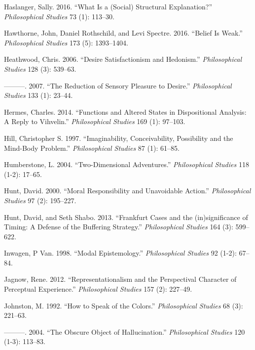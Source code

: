 \documentclass[
  10pt,
  letterpaper,
  DIV=11,
  numbers=noendperiod,
  twoside]{scrartcl}
\newlength{\cslhangindent}
\newenvironment{CSLReferences}[2] %
 {\begin{list}{}{%
  \setlength{\itemindent}{0pt}
  \setlength{\leftmargin}{0pt}
  \setlength{\parsep}{0pt}
  \ifodd #1
   \setlength{\leftmargin}{\cslhangindent}
   \setlength{\itemindent}{-1\cslhangindent}
  \fi
  \setlength{\itemsep}{#2\baselineskip}}}
 {\end{list}}
\begin{document}
\begin{CSLReferences}{1}{0}
Haslanger, Sally. 2016. {``What Is a (Social) Structural Explanation?''}
\emph{Philosophical Studies} 73 (1): 113--30.

Hawthorne, John, Daniel Rothschild, and Levi Spectre. 2016. {``Belief Is
Weak.''} \emph{Philosophical Studies} 173 (5): 1393--1404.

Heathwood, Chris. 2006. {``Desire Satisfactionism and Hedonism.''}
\emph{Philosophical Studies} 128 (3): 539--63.

---------. 2007. {``The Reduction of Sensory Pleasure to Desire.''}
\emph{Philosophical Studies} 133 (1): 23--44.

Hermes, Charles. 2014. {``Functions and Altered States in Dispositional
Analysis: A Reply to Vihvelin.''} \emph{Philosophical Studies} 169 (1):
97--103.

Hill, Christopher S. 1997. {``Imaginability, Conceivability, Possibility
and the Mind-Body Problem.''} \emph{Philosophical Studies} 87 (1):
61--85.

Humberstone, L. 2004. {``Two-Dimensional Adventures.''}
\emph{Philosophical Studies} 118 (1-2): 17--65.

Hunt, David. 2000. {``Moral Responsibility and Unavoidable Action.''}
\emph{Philosophical Studies} 97 (2): 195--227.

Hunt, David, and Seth Shabo. 2013. {``Frankfurt Cases and the
(in)significance of Timing: A Defense of the Buffering Strategy.''}
\emph{Philosophical Studies} 164 (3): 599--622.

Inwagen, P Van. 1998. {``Modal Epistemology.''} \emph{Philosophical
Studies} 92 (1-2): 67--84.

Jagnow, Rene. 2012. {``Representationalism and the Perspectival
Character of Perceptual Experience.''} \emph{Philosophical Studies} 157
(2): 227--49.

Johnston, M. 1992. {``How to Speak of the Colors.''} \emph{Philosophical
Studies} 68 (3): 221--63.

---------. 2004. {``The Obscure Object of Hallucination.''}
\emph{Philosophical Studies} 120 (1-3): 113--83.


\end{CSLReferences}
\end{document}
